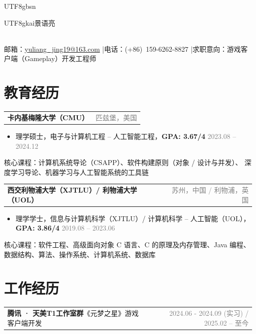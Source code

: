 \documentclass[a4paper, 10.5pt]{article}
\makeatletter
\newcommand{\entryhead}[3]{%
  \noindent
  \begin{tabularx}{\linewidth}{@{}X r@{}}
    \textbf{#1}\enspace #2 & \small\textcolor{gray}{#3}
  \end{tabularx}\vspace{1pt}}
\newcommand{\entryheadsingle}[2]{%
  \noindent
  \begin{tabularx}{\linewidth}{@{}X r@{}}
    \textbf{#1} & \small\textcolor{gray}{#2}
  \end{tabularx}\vspace{1pt}}
\makeatother
\begin{document}
\begin{CJK}{UTF8}{gbsn}   %

\begin{center}
  {\Large\bfseries\begin{CJK}{UTF8}{gkai}景语亮\end{CJK}}\\[4pt]
  \small
  邮箱：\href{mailto:yuliang_jing19@163.com}{yuliang\_jing19@163.com}
  \enspace|\enspace 电话：(+86)~159-6262-8827
  \enspace|\enspace 求职意向：游戏客户端（Gameplay）开发工程师
\end{center}

\vspace{2pt}

\section{教育经历}

\small
\entryheadsingle{卡内基梅隆大学（CMU）}{匹兹堡，美国}
\begin{itemize}
  \item 理学硕士，电子与计算机工程 -- 人工智能工程，\textbf{GPA: 3.67/4}
        \hfill \textcolor{gray}{2023.08 -- 2024.12}
\end{itemize}
核心课程：计算机系统导论（CSAPP）、软件构建原则（对象 / 设计与并发）、
深度学习导论、机器学习与人工智能系统的工具链

\vspace{5pt}

\entryheadsingle{西交利物浦大学（XJTLU）/ 利物浦大学（UOL）}{苏州，中国 / 利物浦，英国}
\begin{itemize}
  \item 理学学士，信息与计算机科学（XJTLU）/ 计算机科学 -- 人工智能（UOL），\textbf{GPA: 3.86/4}
        \hfill \textcolor{gray}{2019.08 -- 2023.06}
\end{itemize}
核心课程：软件工程、高级面向对象 C 语言、C 的原理及内存管理、Java 编程、
数据结构、算法、操作系统、计算机系统、数据库

\section{工作经历}

\entryhead{腾讯 · 天美T1工作室群}{《元梦之星》\quad 游戏客户端开发}{2024.06 - 2024.09 (实习) / 2025.02 -- 至今}


\end{CJK}
\end{document}
